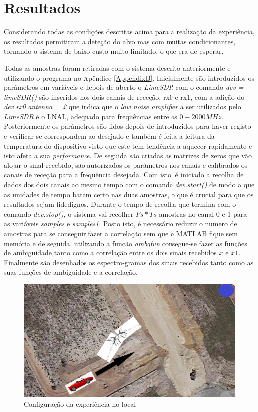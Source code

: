 \section{Resultados}
Considerando todas as condições descritas acima para a realização da experiência, os resultados permitiram a deteção do alvo mas com muitas condicionantes, tornando o sistema de baixo custo muito limitado, o que era de esperar. \par  
Todas as amostras foram retiradas com o sistema descrito anteriormente e utilizando o programa no Apêndice \ref{AppendixB}. Inicialmente são introduzidos os parâmetros em variáveis e depois de aberto o \textit{LimeSDR} com o comando \textit{dev = limeSDR()} são inseridos nos dois canais de receção, rx0 e rx1, com a adição do \textit{dev.rx0.antenna = 2} que indica que o \textit{low noise amplifier} a ser utilizados pelo \textit{LimeSDR} é o LNAL, adequado para frequências entre os $0 - 2000 MHz$. Posteriormente os parâmetros são lidos depois de introduzidos para haver registo e verificar se correspondem ao desejado e também é feita a leitura da temperatura do dispositivo visto que este tem tendência a aquecer rapidamente e isto afeta a sua \textit{performance}. De seguida são criadas as matrizes de zeros que vão alojar o sinal recebido, são autorizados os parâmetros nos canais e calibrados os canais de receção para a frequência desejada. Com isto, é iniciado a recolha de dados dos dois canais ao mesmo tempo com o comando \textit{dev.start()} de modo a que as unidades de tempo batam certo nas duas amostras, o que é crucial para que os resultados sejam fidedignos. Durante o tempo de recolha que termina com o comando \textit{dev.stop()}, o sistema vai recolher $Fs*Ts$ amostras no canal 0 e 1 para as variáveis \textit{samples} e \textit{samples1}. Posto isto, é necessário reduzir o numero de amostras para se conseguir fazer a correlação sem que o MATLAB fique sem memória e de seguida, utilizando a função \textit{ambgfun} consegue-se fazer as funções de ambiguidade tanto como a correlação entre os dois sinais recebidos $x$ e $x1$. Finalmente são desenhados os espectro-gramas  dos sinais recebidos tanto como as suas funções de ambiguidade e a correlação.\par 

\begin{figure}[h]
\centering
\includegraphics[scale=0.35]{chapters/ch5/assets/geoexpfin}
\caption[Configuração da experiência]{Configuração da experiência no local}
\label{fig:geoexp}
\end{figure}

